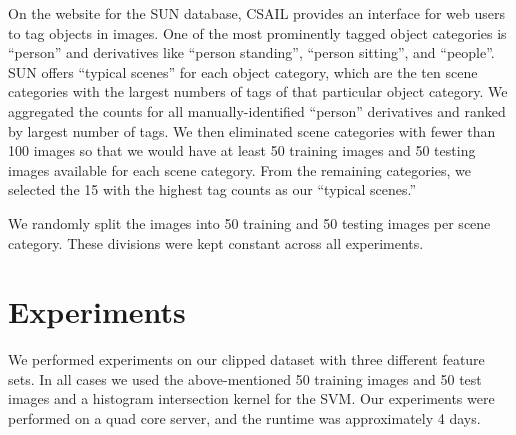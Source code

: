 \documentclass[11pt]{article}
\begin{document}
On the website for the SUN database, CSAIL provides an interface for web users to tag objects in images.  One of the most prominently tagged object categories is ``person'' and derivatives like ``person standing'', ``person sitting'', and ``people''.  SUN offers ``typical scenes'' for each object category, which are the ten scene categories with the largest numbers of tags of that particular object category.  We aggregated the counts for all manually-identified ``person'' derivatives and ranked by largest number of tags.  We then eliminated scene categories with fewer than 100 images so that we would have at least 50 training images and 50 testing images available for each scene category.  From the remaining categories, we selected the 15 with the highest tag counts as our ``typical scenes.''

We randomly split the images into 50 training and 50 testing images per scene category.  These divisions were kept constant across all experiments.






\section{Experiments}
We performed experiments on our clipped dataset with three different feature sets.  In all cases we used the above-mentioned 50 training images and 50 test images and a histogram intersection kernel for the SVM.  Our experiments were performed on a quad core server, and the runtime was approximately 4 days.
\end{document}
